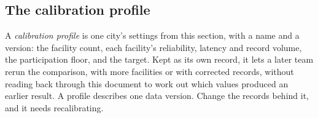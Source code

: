 \subsection{The calibration profile}
A \emph{calibration profile} is one city's settings from this section, with a name and a version:
the facility count, each facility's reliability, latency and record volume, the participation floor,
and the target. Kept as its own record, it lets a later team rerun the comparison, with more
facilities or with corrected records, without reading back through this document to work out which
values produced an earlier result. A profile describes one data version. Change the records behind
it, and it needs recalibrating.
